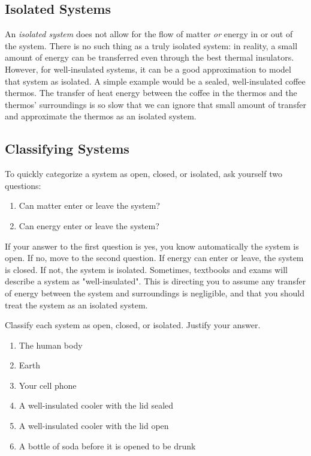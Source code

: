 \subsection{Isolated Systems}
An \textit{isolated system} does not allow for the flow of matter \textit{or} 
energy in or out of the system. There is no such thing as a truly isolated system: in reality, a small amount of energy can be transferred even through the best 
thermal insulators. However, for well-insulated systems, it can be a good 
approximation to model that system as isolated. A simple example would be a 
sealed, well-insulated coffee thermos. The transfer of heat energy between the 
coffee in the thermos and the thermos' surroundings is so slow that we can ignore
that small amount of transfer and approximate the thermos as an isolated system. 

\subsection{Classifying Systems}
To quickly categorize a system as open, closed, or isolated, ask yourself two questions:
\begin{enumerate}
\item Can matter enter or leave the system?
\item Can energy enter or leave the system?
\end{enumerate}

If your answer to the first question is yes, you know automatically the system 
is open. If no, move to the second question. If energy can enter or leave, the 
system is closed. If not, the system is isolated. Sometimes, textbooks and exams 
will describe a system as "well-insulated". This is directing you to assume any 
transfer of energy between the system and surroundings is negligible, and that 
you should treat the system as an isolated system. 

\begin{Exercise}[title = {Open, Closed, and Isolated Systems}, label = systems]
Classify each system as open, closed, or isolated. Justify your answer. 
\begin{enumerate}
\item The human body
\item Earth
\item Your cell phone
\item A well-insulated cooler with the lid sealed
\item A well-insulated cooler with the lid open
\item A bottle of soda before it is opened to be drunk
\end{enumerate}
\end{Exercise}

